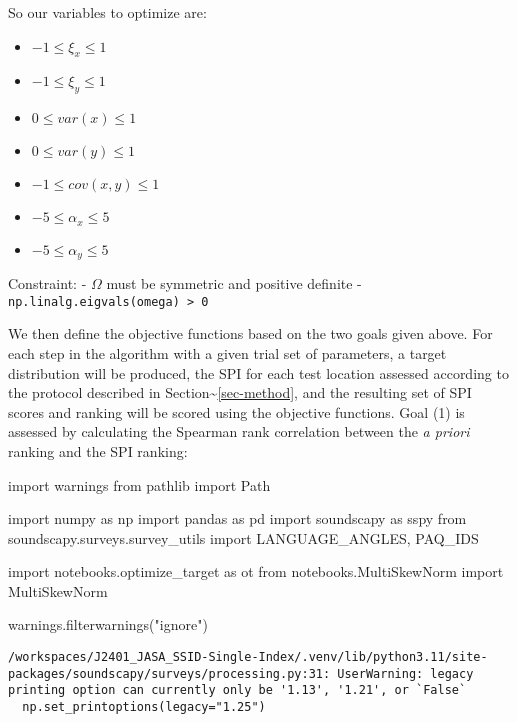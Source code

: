 \documentclass[
  letterpaper,
  DIV=11,
  numbers=noendperiod]{scrartcl}
\newenvironment{Shaded}{\begin{snugshade}}{\end{snugshade}}
\newcommand{\ImportTok}[1]{\textcolor[rgb]{0.00,0.46,0.62}{#1}}
\newcommand{\NormalTok}[1]{\textcolor[rgb]{0.00,0.23,0.31}{#1}}
\newcommand{\StringTok}[1]{\textcolor[rgb]{0.13,0.47,0.30}{#1}}
\providecommand{\tightlist}{%
  \setlength{\itemsep}{0pt}\setlength{\parskip}{0pt}}\usepackage{longtable,booktabs,array}
\begin{document}
So our variables to optimize are:

\begin{itemize}
\tightlist
\item
  \(-1 \leq \xi_x \leq 1\)
\item
  \(-1 \leq \xi_y \leq 1\)
\item
  \(0 \leq var(x) \leq 1\)
\item
  \(0 \leq var(y) \leq 1\)
\item
  \(-1 \leq cov(x, y) \leq 1\)
\item
  \(-5 \leq \alpha_x \leq 5\)
\item
  \(-5 \leq \alpha_y \leq 5\)
\end{itemize}

Constraint: - \(\Omega\) must be symmetric and positive definite -
\texttt{np.linalg.eigvals(omega)\ \textgreater{}\ 0}

We then define the objective functions based on the two goals given
above. For each step in the algorithm with a given trial set of
parameters, a target distribution will be produced, the SPI for each
test location assessed according to the protocol described in
Section\textasciitilde{}\ref{sec-method}, and the resulting set of SPI
scores and ranking will be scored using the objective functions. Goal
(1) is assessed by calculating the Spearman rank correlation between the
\emph{a priori} ranking and the SPI ranking:

\begin{Shaded}
\begin{Highlighting}[]
\ImportTok{import}\NormalTok{ warnings}
\ImportTok{from}\NormalTok{ pathlib }\ImportTok{import}\NormalTok{ Path}

\ImportTok{import}\NormalTok{ numpy }\ImportTok{as}\NormalTok{ np}
\ImportTok{import}\NormalTok{ pandas }\ImportTok{as}\NormalTok{ pd}
\ImportTok{import}\NormalTok{ soundscapy }\ImportTok{as}\NormalTok{ sspy}
\ImportTok{from}\NormalTok{ soundscapy.surveys.survey\_utils }\ImportTok{import}\NormalTok{ LANGUAGE\_ANGLES, PAQ\_IDS}

\ImportTok{import}\NormalTok{ notebooks.optimize\_target }\ImportTok{as}\NormalTok{ ot}
\ImportTok{from}\NormalTok{ notebooks.MultiSkewNorm }\ImportTok{import}\NormalTok{ MultiSkewNorm}

\NormalTok{warnings.filterwarnings(}\StringTok{"ignore"}\NormalTok{)}
\end{Highlighting}
\end{Shaded}

\begin{verbatim}
/workspaces/J2401_JASA_SSID-Single-Index/.venv/lib/python3.11/site-packages/soundscapy/surveys/processing.py:31: UserWarning: legacy printing option can currently only be '1.13', '1.21', or `False`
  np.set_printoptions(legacy="1.25")
\end{verbatim}
\end{document}
